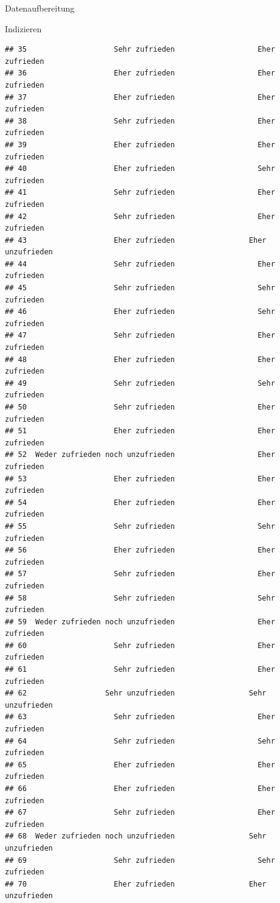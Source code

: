 \documentclass[ignorenonframetext,]{beamer}
\begin{document}
\begin{frame}[fragile]{Datenaufbereitung}
\begin{block}{Indizieren}
\begin{verbatim}
## 35                    Sehr zufrieden                   Eher zufrieden
## 36                    Eher zufrieden                   Eher zufrieden
## 37                    Eher zufrieden                   Eher zufrieden
## 38                    Sehr zufrieden                   Eher zufrieden
## 39                    Eher zufrieden                   Eher zufrieden
## 40                    Eher zufrieden                   Sehr zufrieden
## 41                    Sehr zufrieden                   Eher zufrieden
## 42                    Sehr zufrieden                   Eher zufrieden
## 43                    Eher zufrieden                 Eher unzufrieden
## 44                    Sehr zufrieden                   Eher zufrieden
## 45                    Sehr zufrieden                   Sehr zufrieden
## 46                    Eher zufrieden                   Sehr zufrieden
## 47                    Sehr zufrieden                   Eher zufrieden
## 48                    Eher zufrieden                   Eher zufrieden
## 49                    Sehr zufrieden                   Sehr zufrieden
## 50                    Sehr zufrieden                   Eher zufrieden
## 51                    Eher zufrieden                   Eher zufrieden
## 52  Weder zufrieden noch unzufrieden                   Eher zufrieden
## 53                    Eher zufrieden                   Eher zufrieden
## 54                    Eher zufrieden                   Eher zufrieden
## 55                    Sehr zufrieden                   Sehr zufrieden
## 56                    Eher zufrieden                   Eher zufrieden
## 57                    Sehr zufrieden                   Eher zufrieden
## 58                    Sehr zufrieden                   Sehr zufrieden
## 59  Weder zufrieden noch unzufrieden                   Eher zufrieden
## 60                    Sehr zufrieden                   Eher zufrieden
## 61                    Sehr zufrieden                   Eher zufrieden
## 62                  Sehr unzufrieden                 Sehr unzufrieden
## 63                    Sehr zufrieden                   Eher zufrieden
## 64                    Sehr zufrieden                   Sehr zufrieden
## 65                    Eher zufrieden                   Eher zufrieden
## 66                    Eher zufrieden                   Eher zufrieden
## 67                    Sehr zufrieden                   Eher zufrieden
## 68  Weder zufrieden noch unzufrieden                 Sehr unzufrieden
## 69                    Sehr zufrieden                   Sehr zufrieden
## 70                    Eher zufrieden                 Eher unzufrieden

\end{verbatim}
\end{block}
\end{frame}
\end{document}
